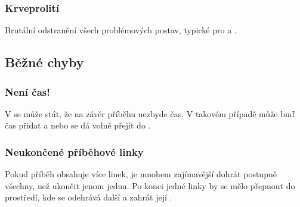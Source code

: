 \documentclass[main.tex]{subfiles}
\begin{document}
\subsubsection{ Krveprolití } Brutální odstranění všech problémových postav, typické pro  a . 
 
 
\subsection{ Běžné chyby }  
\subsubsection{ Není čas! } V  se může stát, že na závěr příběhu nezbyde čas. V takovém případě může buď  čas přidat a nebo se dá volně přejít do . 
 
\subsubsection{ Neukončené příběhové linky } Pokud příběh obsahuje více linek, je mnohem zajímavější dohrát postupně všechny, než ukončit jenom jednu. Po konci jedné linky by se mělo přepnout do prostředí, kde se odehrává další a zahrát její . 
 
 
 
\end{document}

